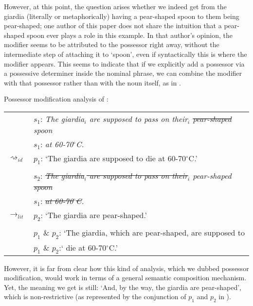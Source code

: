 \documentclass[output=paper]{langsci/langscibook}
\begin{document}
However, at this point, the question arises whether we indeed get from the giardia (literally or metaphorically) having a pear-shaped spoon to them being pear-shaped; one author of this paper does not share the intuition that a pear-shaped spoon ever plays a role in this example. In that author's opinion, the modifier seems to be attributed to the possessor right away, without the intermediate step of attaching it to `spoon', even if syntactically this is where the modifier appears. This seems to indicate that if we explicitly add a possessor via a possessive determiner inside the nominal phrase, we can combine the modifier with that possessor rather than with the noun itself, as in .

\ea \label{analysis2 pear-shaped spoon} 
Possessor modification analysis of : \\
\vspace{5pt}
\begin{tabular}{ll}
								& 	$s_{1}$: \hspace{4pt} \textit{The giardia$_{i}$ are supposed to pass on their$_{i}$ \sout{pear-shaped} spoon} \\
								&	{\white $s_{1}$:} \hspace{4pt} \textit{at 60-70$^\circ$C.} \\
$\rightsquigarrow_{id}$				&	$p_{1}$: \hspace{1pt} `The giardia are supposed to die at 60-70$^\circ$C.' \\
\vspace{-5pt} \\
								& 	$s_{2}$: \hspace{4pt} \textit{\sout{The giardia$_{i}$ are supposed to pass on their}$_{i}$ pear-shaped \sout{spoon}} \\
								&	{\white $s_{1}$:} \hspace{4pt} \textit{\sout{at 60-70$^\circ$C}.} \\
$\rightarrow_{lit}$					&	$p_{2}$: \hspace{1pt} `The giardia are pear-shaped.' \\
\vspace{-5pt} \\
								&	$p_{1}$ \& $p_{2}$: `The giardia, which are pear-shaped, are supposed to \\
								&	{\white $p_{1}$ \& $p_{2}$:`} die at 60-70$^\circ$C.' 
\end{tabular}
\z

\noindent However, it is far from clear how this kind of analysis, which we dubbed possessor modification, would work in terms of a general semantic composition mechanism. Yet, the meaning we get is still: `And, by the way, the giardia are pear-shaped', which is non-restrictive (as represented by the conjunction of $p_1$ and $p_2$ in ). 
\end{document}
